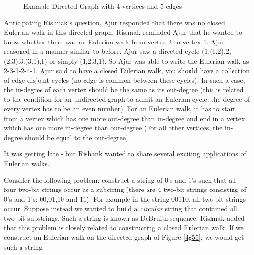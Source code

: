\begin{figure}
\begin{center}
\caption{ Example Directed Graph with 4 vertices and 5 edges}\label{4g5}
\end{center}
\end{figure}


Anticipating Rishnak's question, Ajur responded that there was no closed Eulerian walk in this directed graph. Rishnak reminded Ajur that he wanted to know whether there was an Eulerian walk from vertex 2 to vertex 1. Ajur reasoned in a  manner similar to before. Ajur saw a directed cycle (1,(1,2),2,(2,3),3,(3,1),1) or simply (1,2,3,1). So Ajur was able to write the Eulerian walk as 2-3-1-2-4-1. Ajur said to have a closed Eulerian walk, you should have a collection of edge-disjoint cycles (no edge is common between these cycles). In such a case, the in-degree of each vertex should be the same as its out-degree (this is related to the condition for an undirected graph to admit an Eulerian cycle: the degree of every vertex has to be an even number). For an Eulerian walk, it has to start from a vertex which has one more out-degree than in-degree and end in a vertex which has one more in-degree than out-degree (For all other vertices, the in-degree should be equal to the out-degree).

It was getting late - but Rishank wanted to share several exciting applications of Eulerian walks. 

Consider the following problem: construct a string of 0's and 1's such that all four two-bit strings occur as a substring (there are 4 two-bit strings consisting of 0's and 1's: 00,01,10 and 11). For example in the string 00110, all two-bit strings occur. Suppose instead we wanted to build a \emph{circular} string that contained all two-bit substrings. Such a string is known as DeBruijn sequence. Rishnak added that this problem is closely related to constructing a closed Eulerian walk. If we construct an Eulerian walk on the directed graph of Figure \ref{4g55}, we would get such a string.

